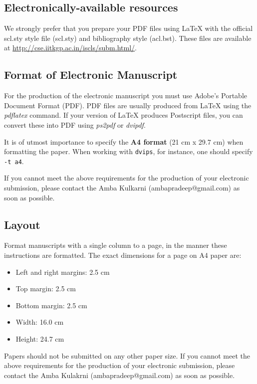 \documentclass[11pt]{article}
\begin{document}
\subsection{Electronically-available resources}

We strongly prefer that you prepare your PDF files using \LaTeX{} with
the official scl.sty style file (scl.sty) and bibliography style
(acl.bst). These files are available at
\url{http://cse.iitkgp.ac.in/iscls/subm.html/}.


\subsection{Format of Electronic Manuscript}
\label{sect:pdf}

For the production of the electronic manuscript you must use Adobe's
Portable Document Format (PDF). PDF files are usually produced from
\LaTeX{} using the \textit{pdflatex} command. If your version of
\LaTeX{} produces Postscript files, you can convert these into PDF
using \textit{ps2pdf} or \textit{dvipdf}.

It is of utmost importance to specify the \textbf{A4 format} (21 cm
x 29.7 cm) when formatting the paper. When working with
{\tt dvips}, for instance, one should specify {\tt -t a4}.

If you cannot meet the above requirements for the
production of your electronic submission, please contact the
Amba Kulkarni (ambapradeep@gmail.com) as soon as possible.

\subsection{Layout}
\label{ssec:layout}

Format manuscripts with a single column to a page, in the manner these
instructions are formatted. The exact dimensions for a page on A4
paper are:

\begin{itemize}
\item Left and right margins: 2.5 cm
\item Top margin: 2.5 cm
\item Bottom margin: 2.5 cm
\item Width: 16.0 cm
\item Height: 24.7 cm
\end{itemize}

\noindent Papers should not be submitted on any other paper size.
If you cannot meet the above requirements for
the production of your electronic submission, please contact the
Amba Kulakrni (ambapradeep@gmail.com) as soon as possible.
\end{document}
